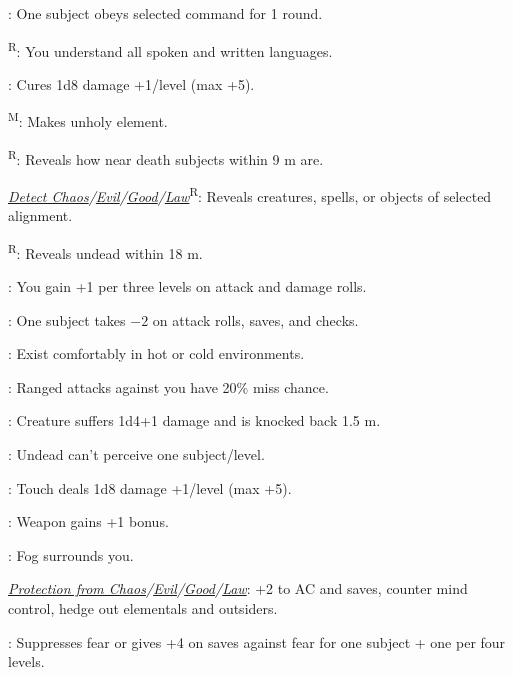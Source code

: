 : One subject obeys selected command for 1 round.

\textsuperscript{R}: You understand all spoken and written languages.

: Cures 1d8 damage +1/level (max +5).

\textsuperscript{M}: Makes unholy element. %

\textsuperscript{R}: Reveals how near death subjects within 9 m are.

\noindent\textit{\hyperref[spell:Detect Chaos]{Detect Chaos}/\hyperref[spell:Detect Evil]{Evil}/\hyperref[spell:Detect Good]{Good}/\hyperref[spell:Detect Law]{Law}}\textsuperscript{R}: Reveals creatures, spells, or objects of selected alignment.

\textsuperscript{R}: Reveals undead within 18 m.

: You gain +1 per three levels on attack and damage rolls.

: One subject takes $-2$ on attack rolls, saves, and checks.

: Exist comfortably in hot or cold environments.

: Ranged attacks against you have 20\% miss chance.

: Creature suffers 1d4+1 damage and is knocked back 1.5 m. %

: Undead can't perceive one subject/level.

: Touch deals 1d8 damage +1/level (max +5).


: Weapon gains +1 bonus.

: Fog surrounds you.

\noindent\textit{\hyperref[spell:Protection from Chaos]{Protection from Chaos}/\hyperref[spell:Protection from Evil]{Evil}/\hyperref[spell:Protection from Good]{Good}/\hyperref[spell:Protection from Law]{Law}}: +2 to AC and saves, counter mind control, hedge out elementals and outsiders.

: Suppresses fear or gives +4 on saves against fear for one subject + one per four levels.

